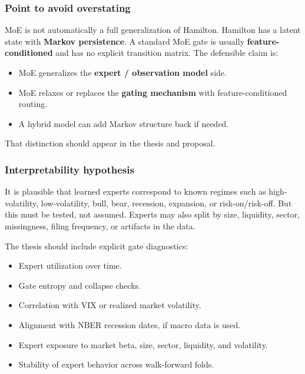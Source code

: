 \subsubsection{Point to avoid
overstating}\label{point-to-avoid-overstating}

MoE is not automatically a full generalization of Hamilton. Hamilton has
a latent state with \textbf{Markov persistence}. A standard MoE gate is
usually \textbf{feature-conditioned} and has no explicit transition
matrix. The defensible claim is:

\begin{itemize}
\tightlist
\item
  MoE generalizes the \textbf{expert / observation model} side.
\item
  MoE relaxes or replaces the \textbf{gating mechanism} with
  feature-conditioned routing.
\item
  A hybrid model can add Markov structure back if needed.
\end{itemize}

That distinction should appear in the thesis and proposal.

\subsubsection{Interpretability
hypothesis}\label{interpretability-hypothesis}

It is plausible that learned experts correspond to known regimes such as
high-volatility, low-volatility, bull, bear, recession, expansion, or
risk-on/risk-off. But this must be tested, not assumed. Experts may also
split by size, liquidity, sector, missingness, filing frequency, or
artifacts in the data.

The thesis should include explicit gate diagnostics:

\begin{itemize}
\tightlist
\item
  Expert utilization over time.
\item
  Gate entropy and collapse checks.
\item
  Correlation with VIX or realized market volatility.
\item
  Alignment with NBER recession dates, if macro data is used.
\item
  Expert exposure to market beta, size, sector, liquidity, and
  volatility.
\item
  Stability of expert behavior across walk-forward folds.
\end{itemize}

